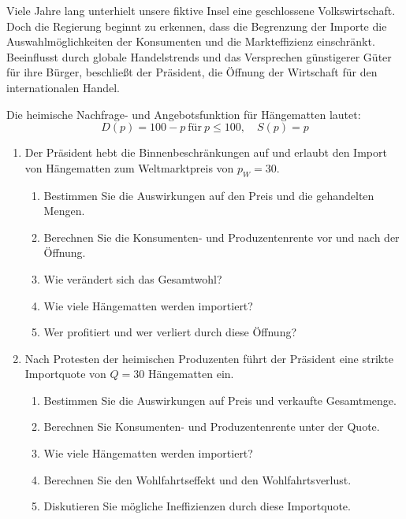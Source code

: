 \begin{question}
	Viele Jahre lang unterhielt unsere fiktive Insel eine geschlossene Volkswirtschaft. Doch die Regierung beginnt zu erkennen, dass die Begrenzung der Importe die Auswahlmöglichkeiten der Konsumenten und die Markteffizienz einschränkt. Beeinflusst durch globale Handelstrends und das Versprechen günstigerer Güter für ihre Bürger, beschließt der Präsident, die Öffnung der Wirtschaft für den internationalen Handel.

	Die heimische Nachfrage- und Angebotsfunktion für Hängematten lautet:
	\[
		D(p) = 100 - p \ \text{für} \ p \leq 100, \quad S(p) = p
	\]

	\begin{enumerate}
		\item Der Präsident hebt die Binnenbeschränkungen auf und erlaubt den Import von Hängematten zum Weltmarktpreis von \( p_W = 30 \).
		      \begin{enumerate}
			      \item Bestimmen Sie die Auswirkungen auf den Preis und die gehandelten Mengen.
			      \item Berechnen Sie die Konsumenten- und Produzentenrente vor und nach der Öffnung.
			      \item Wie verändert sich das Gesamtwohl?
			      \item Wie viele Hängematten werden importiert?
			      \item Wer profitiert und wer verliert durch diese Öffnung?
		      \end{enumerate}

		\item Nach Protesten der heimischen Produzenten führt der Präsident eine strikte Importquote von \( Q = 30 \) Hängematten ein.
		      \begin{enumerate}
			      \item Bestimmen Sie die Auswirkungen auf Preis und verkaufte Gesamtmenge.
			      \item Berechnen Sie Konsumenten- und Produzentenrente unter der Quote.
			      \item Wie viele Hängematten werden importiert?
			      \item Berechnen Sie den Wohlfahrtseffekt und den Wohlfahrtsverlust.
			      \item Diskutieren Sie mögliche Ineffizienzen durch diese Importquote.
		      \end{enumerate}


\end{enumerate}
\end{question}
